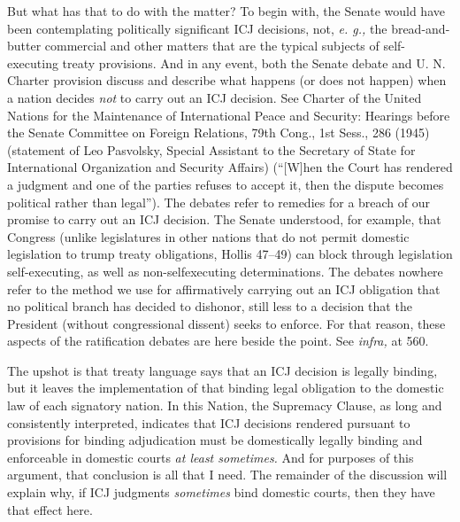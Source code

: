 {  But what has that to do with the matter? To begin with, the Senate
would have been contemplating politically significant ICJ decisions,
not, \emph{e. g.,} the bread-and-butter commercial and other matters that
are the typical subjects of self-executing treaty provisions. And in any
event, both the Senate debate and U. N. Charter provision discuss and
describe what happens (or does not happen) when a nation decides \emph{not}
to carry out an ICJ decision. See Charter of the United Nations for
the Maintenance of International Peace and Security: Hearings before
the Senate Committee on Foreign Relations, 79th Cong., 1st Sess., 286
(1945) (statement \newpage  of Leo Pasvolsky, Special Assistant to the
Secretary of State for International Organization and Security Affairs)
(``[W]hen the Court has rendered a judgment and one of the parties
refuses to accept it, then the dispute becomes political rather than
legal''). The debates refer to remedies for a breach of our promise
to carry out an ICJ decision. The Senate understood, for example, that
Congress (unlike legislatures in other nations that do not permit
domestic legislation to trump treaty obligations, Hollis 47--49) can
block through legislation self-executing, as well as non-selfexecuting
determinations. The debates nowhere refer to the method we use for
affirmatively carrying out an ICJ obligation that no political branch
has decided to dishonor, still less to a decision that the President
(without congressional dissent) seeks to enforce. For that reason, these
aspects of the ratification debates are here beside the point. See
\emph{infra,} at 560.

  The upshot is that treaty language says that an ICJ decision is
legally binding, but it leaves the implementation of that binding
legal obligation to the domestic law of each signatory nation. In this
Nation, the Supremacy Clause, as long and consistently interpreted,
indicates that ICJ decisions rendered pursuant to provisions for binding
adjudication must be domestically legally binding and enforceable
in domestic courts \emph{at least sometimes.} And for purposes of this
argument, that conclusion is all that I need. The remainder of the
discussion will explain why, if ICJ judgments \emph{sometimes} bind
domestic courts, then they have that effect here.

}
